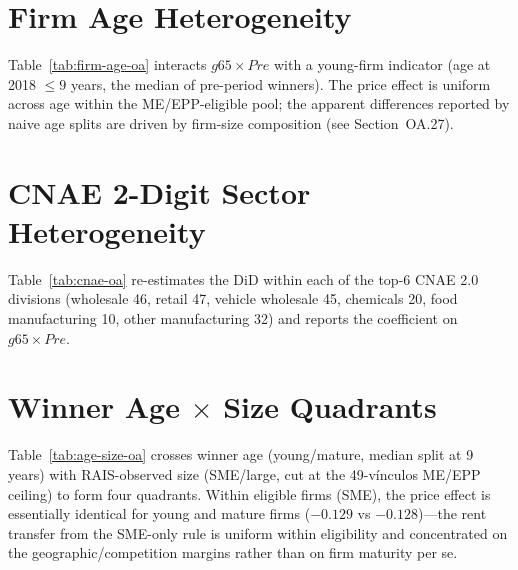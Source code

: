 \documentclass[12pt]{article}
\begin{document}
\section{Firm Age Heterogeneity}

Table~\ref{tab:firm-age-oa} interacts $g65 \times Pre$ with a young-firm indicator (age at 2018 $\leq 9$ years, the median of pre-period winners). The price effect is uniform across age within the ME/EPP-eligible pool; the apparent differences reported by naive age splits are driven by firm-size composition (see Section~OA.27).


\section{CNAE 2-Digit Sector Heterogeneity}

Table~\ref{tab:cnae-oa} re-estimates the DiD within each of the top-6 CNAE 2.0 divisions (wholesale 46, retail 47, vehicle wholesale 45, chemicals 20, food manufacturing 10, other manufacturing 32) and reports the coefficient on $g65 \times Pre$.


\section{Winner Age $\times$ Size Quadrants}

Table~\ref{tab:age-size-oa} crosses winner age (young/mature, median split at 9 years) with RAIS-observed size (SME/large, cut at the 49-v\'inculos ME/EPP ceiling) to form four quadrants. Within eligible firms (SME), the price effect is essentially identical for young and mature firms ($-0.129$ vs $-0.128$)---the rent transfer from the SME-only rule is uniform within eligibility and concentrated on the geographic/competition margins rather than on firm maturity per se.

\end{document}
